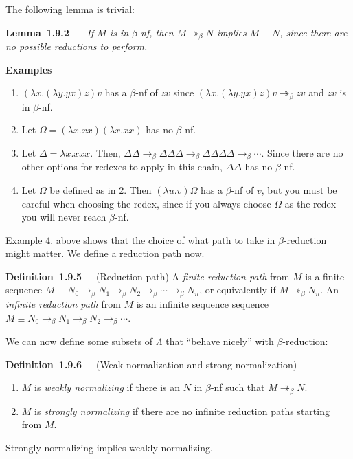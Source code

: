 \documentclass[letterpaper]{article}
\newenvironment{lemma}[2][]{\par\medskip
	\noindent \textbf{Lemma~#2}~~~#1 \rmfamily\em}{\medskip}
\newenvironment{examplesNonNum}[1][]{\par\medskip
	\noindent \textbf{Examples}~~~#1 \rmfamily}{\medskip}
\newenvironment{definition}[2][]{\par\medskip
	\noindent \textbf{Definition~#2}~~~#1 \rmfamily}{\medskip}
\renewcommand{\l}{\lambda}
\newcommand{\bnf}{$\beta$-nf\xspace}
\newcommand{\betaro}{\rightarrow_\beta}
\newcommand{\betar}{\twoheadrightarrow_\beta}
\begin{document}
The following lemma is trivial:

\begin{lemma}{1.9.2}
	If $M$ is in \bnf, then $M \betar N$ implies $M \equiv N$, since there are no possible reductions to perform.
\end{lemma}

\begin{examplesNonNum}
	\begin{enumerate}
		\item $(\l x. (\l y. y x)z)v$ has a \bnf of $zv$ since $(\l x. (\l y. y x)z)v \betar zv$ and $zv$ is in \bnf.
		\item Let $\Omega = (\l x . x x)(\l x . x x)$ has no \bnf.
		\item Let $\Delta = \l x . x x x$. Then, $\Delta \Delta \betaro \Delta \Delta \Delta \betaro \Delta \Delta \Delta \Delta \betaro \cdots$. Since there are no other options for redexes to apply in this chain, $\Delta \Delta$ has no \bnf.
		\item Let $\Omega$ be defined as in 2. Then $(\l u . v)\Omega$ has a \bnf of $v$, but you must be careful when choosing the redex, since if you always choose $\Omega$ as the redex you will never reach \bnf.
	\end{enumerate}
\end{examplesNonNum}

Example 4. above shows that the choice of what path to take in $\beta$-reduction might matter. We define a reduction path now.

\begin{definition}[(Reduction path)]{1.9.5}
	A \emph{finite reduction path} from $M$ is a finite sequence $M \equiv N_0 \betaro N_1 \betaro N_2 \betaro \cdots \betaro N_n$, or equivalently if $M \betar N_n$. An \emph{infinite reduction path} from $M$ is an infinite sequence sequence $M \equiv N_0 \betaro N_1 \betaro N_2 \betaro \cdots$.
\end{definition}

We can now define some subsets of $\Lambda$ that ``behave nicely'' with $\beta$-reduction:

\begin{definition}[(Weak normalization and strong normalization)]{1.9.6}
	\begin{enumerate}
		\item $M$ is \emph{weakly normalizing} if there is an $N$ in \bnf such that $M \betar N$.
		\item $M$ is \emph{strongly normalizing} if there are no infinite reduction paths starting from $M$.
	\end{enumerate}
\end{definition}
Strongly normalizing implies weakly normalizing.
\end{document}
